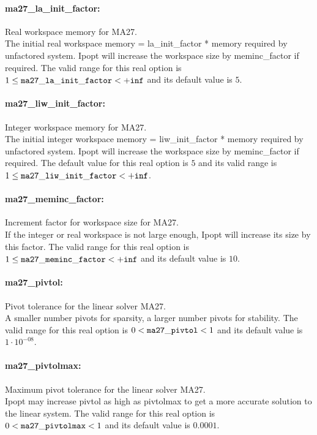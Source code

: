 \paragraph{ma27\_la\_init\_factor:}\label{sec:ma27_la_init_factor} Real workspace memory for MA27. $\;$ \\
 The initial real workspace memory =
la\_init\_factor * memory required by unfactored
system. Ipopt will increase the workspace size by
meminc\_factor if required. The valid range for this real option is 
$1 \le {\tt ma27\_la\_init\_factor } <  {\tt +inf}$
and its default value is $5$.


\paragraph{ma27\_liw\_init\_factor:}\label{sec:ma27_liw_init_factor} Integer workspace memory for MA27. $\;$ \\
 The initial integer workspace memory =
liw\_init\_factor * memory required by unfactored
system. Ipopt will increase the workspace size by
meminc\_factor if required.  The default value for this real option is $5$ and its valid range is
$1 \le {\tt ma27\_liw\_init\_factor } <  {\tt +inf}$.


\paragraph{ma27\_meminc\_factor:}\label{sec:ma27_meminc_factor} Increment factor for workspace size for MA27. $\;$ \\
 If the integer or real workspace is not large
enough, Ipopt will increase its size by this
factor.  The valid range for this real option is 
$1 \le {\tt ma27\_meminc\_factor } <  {\tt +inf}$
and its default value is $10$.


\paragraph{ma27\_pivtol:}\label{sec:ma27_pivtol} Pivot tolerance for the linear solver MA27. $\;$ \\
 A smaller number pivots for sparsity, a larger
number pivots for stability. The valid range for this real option is 
$0 <  {\tt ma27\_pivtol } <  1$
and its default value is $1 \cdot 10^{-08}$.


\paragraph{ma27\_pivtolmax:}\label{sec:ma27_pivtolmax} Maximum pivot tolerance for the linear solver MA27. $\;$ \\
 Ipopt may increase pivtol as high as pivtolmax to
get a more accurate solution to the linear
system. The valid range for this real option is 
$0 <  {\tt ma27\_pivtolmax } <  1$
and its default value is $0.0001$.


